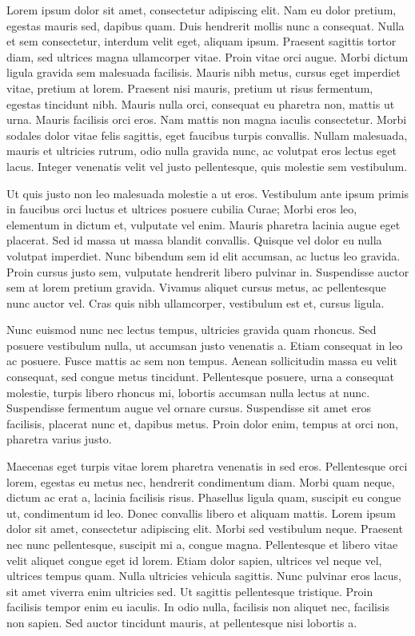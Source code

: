 \documentclass[extra,mreferee]{gji}
\begin{document}
Lorem ipsum dolor sit amet, consectetur adipiscing elit. Nam eu dolor pretium,
egestas mauris sed, dapibus quam. Duis hendrerit mollis nunc a consequat. Nulla
et sem consectetur, interdum velit eget, aliquam ipsum. Praesent sagittis
tortor diam, sed ultrices magna ullamcorper vitae. Proin vitae orci augue.
Morbi dictum ligula gravida sem malesuada facilisis. Mauris nibh metus, cursus
eget imperdiet vitae, pretium at lorem. Praesent nisi mauris, pretium ut risus
fermentum, egestas tincidunt nibh. Mauris nulla orci, consequat eu pharetra
non, mattis ut urna. Mauris facilisis orci eros. Nam mattis non magna iaculis
consectetur. Morbi sodales dolor vitae felis sagittis, eget faucibus turpis
convallis. Nullam malesuada, mauris et ultricies rutrum, odio nulla gravida
nunc, ac volutpat eros lectus eget lacus. Integer venenatis velit vel justo
pellentesque, quis molestie sem vestibulum.

Ut quis justo non leo malesuada molestie a ut eros. Vestibulum ante ipsum
primis in faucibus orci luctus et ultrices posuere cubilia Curae; Morbi eros
leo, elementum in dictum et, vulputate vel enim. Mauris pharetra lacinia augue
eget placerat. Sed id massa ut massa blandit convallis. Quisque vel dolor eu
nulla volutpat imperdiet. Nunc bibendum sem id elit accumsan, ac luctus leo
gravida. Proin cursus justo sem, vulputate hendrerit libero pulvinar in.
Suspendisse auctor sem at lorem pretium gravida. Vivamus aliquet cursus metus,
ac pellentesque nunc auctor vel. Cras quis nibh ullamcorper, vestibulum est et,
cursus ligula.

Nunc euismod nunc nec lectus tempus, ultricies gravida quam rhoncus. Sed
posuere vestibulum nulla, ut accumsan justo venenatis a. Etiam consequat in leo
ac posuere. Fusce mattis ac sem non tempus. Aenean sollicitudin massa eu velit
consequat, sed congue metus tincidunt. Pellentesque posuere, urna a consequat
molestie, turpis libero rhoncus mi, lobortis accumsan nulla lectus at nunc.
Suspendisse fermentum augue vel ornare cursus. Suspendisse sit amet eros
facilisis, placerat nunc et, dapibus metus. Proin dolor enim, tempus at orci
non, pharetra varius justo.

Maecenas eget turpis vitae lorem pharetra venenatis in sed eros. Pellentesque
orci lorem, egestas eu metus nec, hendrerit condimentum diam. Morbi quam neque,
dictum ac erat a, lacinia facilisis risus. Phasellus ligula quam, suscipit eu
congue ut, condimentum id leo. Donec convallis libero et aliquam mattis. Lorem
ipsum dolor sit amet, consectetur adipiscing elit. Morbi sed vestibulum neque.
Praesent nec nunc pellentesque, suscipit mi a, congue magna. Pellentesque et
libero vitae velit aliquet congue eget id lorem. Etiam dolor sapien, ultrices
vel neque vel, ultrices tempus quam. Nulla ultricies vehicula sagittis. Nunc
pulvinar eros lacus, sit amet viverra enim ultricies sed. Ut sagittis
pellentesque tristique. Proin facilisis tempor enim eu iaculis. In odio nulla,
facilisis non aliquet nec, facilisis non sapien. Sed auctor tincidunt mauris,
at pellentesque nisi lobortis a.
\end{document}
